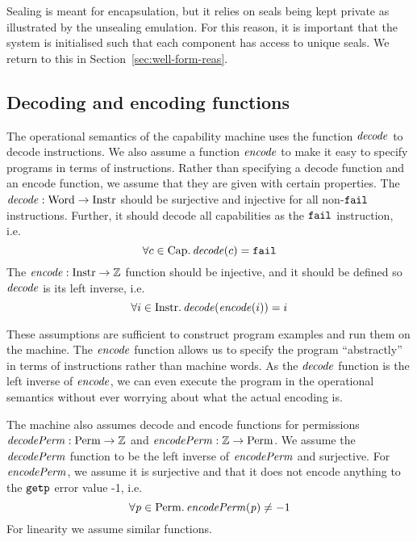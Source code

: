 \documentclass[acmsmall,screen]{acmart}\settopmatter{}
\renewcommand{\decInstr}[1]{\plainfun{decode}{#1}}
\renewcommand{\encInstr}[1]{\plainfun{encode}{#1}}
\renewcommand{\perm}{\var{p}}
\renewcommand{\sectionname}{Section}
\newenvironment{jversion}%
    {\color{OliveGreen}}{}
\begin{document}
\begin{jversion}
  Sealing is meant for encapsulation, but it relies on seals being kept private as illustrated by the unsealing emulation.
  For this reason, it is important that the system is initialised such that each component has access to unique seals.
  We return to this in \sectionname~\ref{sec:well-form-reas}.
\end{jversion}

\begin{jversion}
\subsection{Decoding and encoding functions}
The operational semantics of the capability machine uses the function $\decInstr{}$ to decode instructions.
We also assume a function $\encInstr{}$ to make it easy to specify programs in terms of instructions.
Rather than specifying a decode function and an encode function, we assume that they are given with certain properties.
The $\decInstr{} : \Word \fun \Instr$ should be surjective and injective for all non-$\texttt{{\color{black} fail}}$ instructions.
Further, it should decode all capabilities as the $\texttt{{\color{black} fail}}$ instruction, i.e.\
\[
\forall c \in \Caps \ldotp \decInstr{c} = \fail
\]
The $\encInstr{} : \Instr \fun \ints$ function should be injective, and it should be defined so $\decInstr{}$ is its left inverse, i.e.
\[
\forall i \in \Instr \ldotp \decInstr{}(\encInstr{i}) = i
\]

These assumptions are sufficient to construct program examples and run them on the machine.
The $\encInstr{}$ function allows us to specify the program ``abstractly'' in terms of instructions rather than machine words.
As the $\decInstr{}$ function is the left inverse of $\encInstr{}$, we can even execute the program in the operational semantics without ever worrying about what the actual encoding is.

The machine also assumes decode and encode functions for permissions $\decPerm{} : \Perm \fun \ints$ and $\encPerm{} : \ints \fun \Perm$.
We assume the $\decPerm{}$ function to be the left inverse of $\encPerm{}$ and surjective. For $\encPerm{}$, we assume it is surjective and that it does not encode anything to the $\tgetp{}{}$ error value -1, i.e.
\[
  \forall \perm \in \Perm \ldotp \encPerm{\perm} \neq -1
\]
For linearity we assume similar functions.


\end{jversion}
\end{document}
